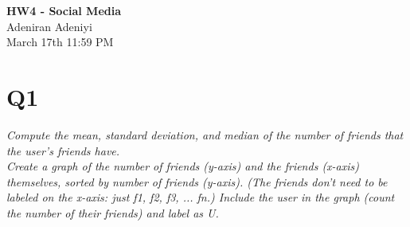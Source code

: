 \documentclass[12pt]{article}
\begin{document}
\begin{centering}
{\large\textbf{HW4 - Social Media}}\\ %
Adeniran Adeniyi\\                     %
March 17th 11:59 PM\\                      %
\end{centering}



\section*{Q1}
\emph{Compute the mean, standard deviation, and median of the number of friends that the user's friends have.\\
Create a graph of the number of friends (y-axis) and the friends (x-axis) themselves, sorted by number of friends (y-axis). (The friends don't need to be labeled on the x-axis: just f1, f2, f3, ... fn.) Include the user in the graph (count the number of their friends) and label as U.}
\subsection*{\color{blue}{Answer}}

\end{document}
